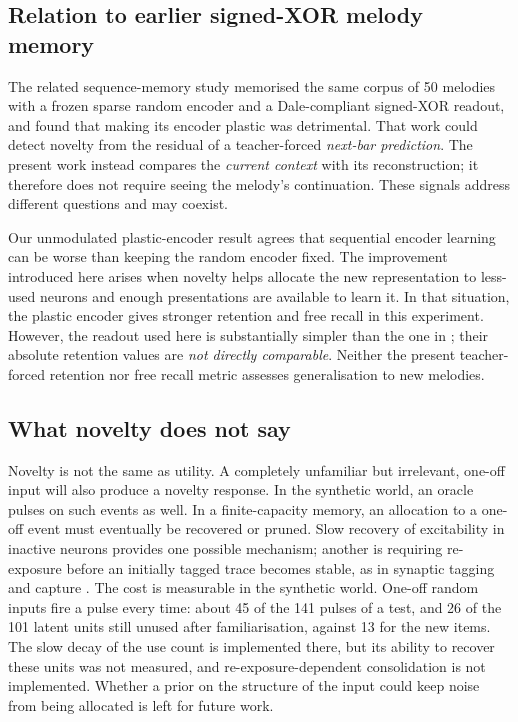 \documentclass[11pt,a4paper]{article}
\begin{document}
\subsection{Relation to earlier signed-XOR melody memory}
The related sequence-memory study \citet{pena2026songs} memorised the same corpus of 50 melodies with a frozen sparse random encoder and a Dale-compliant signed-XOR readout, and found that making its encoder plastic was detrimental. That work could detect novelty from the residual of a teacher-forced \emph{next-bar prediction}. The present work instead compares the \emph{current context} with its reconstruction; it therefore does not require seeing the melody's continuation. These signals address different questions and may coexist.

Our unmodulated plastic-encoder result agrees that sequential encoder learning can be worse than keeping the random encoder fixed. The improvement introduced here arises when novelty helps allocate the new representation to less-used neurons and enough presentations are available to learn it. In that situation, the plastic encoder gives stronger retention and free recall in this experiment. However, the readout used here is substantially simpler than the one in \citet{pena2026songs}; their absolute retention values are \emph{not directly comparable}. Neither the present teacher-forced retention nor free recall metric assesses generalisation to new melodies.

\subsection{What novelty does not say}
Novelty is not the same as utility. A completely unfamiliar but irrelevant, one-off input will also produce a novelty response. In the synthetic world, an oracle pulses on such events as well. In a finite-capacity memory, an allocation to a one-off event must eventually be recovered or pruned. Slow recovery of excitability in inactive neurons provides one possible mechanism; another is requiring re-exposure before an initially tagged trace becomes stable, as in synaptic tagging and capture \citep{frey1997,moncada2007}. The cost is measurable in the synthetic world. One-off random inputs fire a pulse every time: about 45 of the 141 pulses of a test, and 26 of the 101 latent units still unused after familiarisation, against 13 for the new items. The slow decay of the use count is implemented there, but its ability to recover these units was not measured, and re-exposure-dependent consolidation is not implemented. Whether a prior on the structure of the input could keep noise from being allocated is left for future work.
\end{document}

